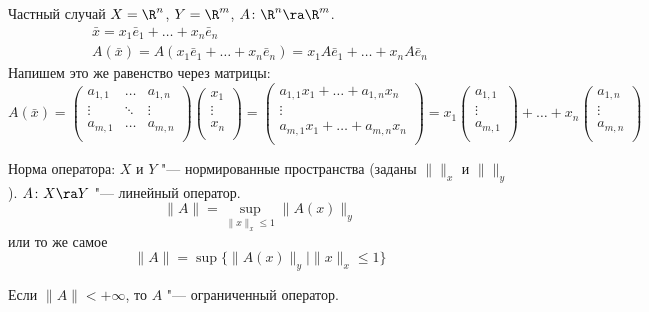 Частный случай $X = \R^n$, $Y = \R^m$, $A \colon \R^n \ra \R^m$.
\begin{gather*}
	\bar x = x_1 \bar e_1 + \dots + x_n \bar e_n \\
	A(\bar x) = A(x_1 \bar e_1 + \dots + x_n \bar e_n) = x_1A \bar e_1 + \dots + x_nA \bar e_n
\end{gather*}
Напишем это же равенство через матрицы:
\[
	A(\bar x) =
	\begin{pmatrix}
		a_{1, 1} & \dots & a_{1, n}\\
		\vdots & \ddots & \vdots\\
		a_{m, 1} & \dots & a_{m, n}\\
	\end{pmatrix}
	\begin{pmatrix}
		x_1\\
		\vdots\\
		x_n\\
	\end{pmatrix}
	=
	\begin{pmatrix}
		a_{1, 1}x_1 + \dots + a_{1, n}x_n\\
		\vdots\\
		a_{m, 1}x_1 + \dots + a_{m, n}x_n\\
	\end{pmatrix}
	=
	x_1
	\begin{pmatrix}
		a_{1, 1}\\
		\vdots\\
		a_{m, 1}\\
	\end{pmatrix}
	+ \dots
	+ x_n
	\begin{pmatrix}
		a_{1, n}\\
		\vdots\\
		a_{m, n}\\
	\end{pmatrix}
\]

\begin{Def}
	Норма оператора:
	$X$ и $Y$ "--- нормированные пространства (заданы $\|\|_x$ и $\|\|_y$).
	$A \colon X \ra Y$ "--- линейный оператор.
	\[ \|A\| = \sup_{\|x\|_x \le 1} \|A(x)\|_y \]
	или то же самое
	\[ \|A\| = \sup \{\|A(x)\|_y \mid \|x\|_x \le 1\} \]
\end{Def}
\begin{Def}
	Если $\|A\| < +\infty$, то $A$ "--- ограниченный оператор.
\end{Def}

